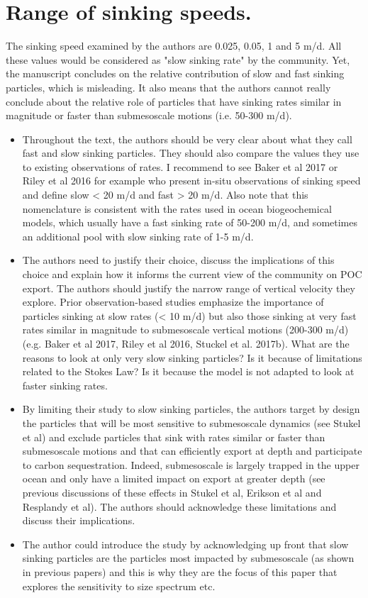 \documentclass[article,linenumbers]{agujournal2018}
\begin{document}
	\color{red}
	\section*{Range of sinking speeds.}
	The sinking speed examined by the authors are 0.025, 0.05, 1 and 5 m/d. All these values would be considered as "slow sinking rate" by the community. Yet, the manuscript concludes on the relative contribution of slow and fast sinking particles, which is misleading. It also means that the authors cannot really conclude about the relative role of particles that have sinking rates similar in magnitude or faster than submesoscale motions (i.e. 50-300 m/d).
	
	\begin{itemize}
	\item Throughout the text, the authors should be very clear about what they call fast and slow sinking particles. They should also compare the values they use to existing observations of rates. I recommend to see Baker et al 2017 or Riley et al 2016 for example who present in-situ observations of sinking speed and define slow < 20 m/d and fast > 20 m/d. Also note that this nomenclature is consistent with the rates used in ocean biogeochemical models, which usually have a fast sinking rate of 50-200 m/d, and sometimes an additional pool with slow sinking rate of 1-5 m/d. 
	
	
	\item The authors need to justify their choice, discuss the implications of this choice and explain how it informs the current view of the community on POC export. The authors should justify the narrow range of vertical velocity they explore. Prior observation-based studies emphasize the importance of particles sinking at slow rates (< 10 m/d) but also those sinking at very fast rates similar in magnitude to submesoscale vertical motions (200-300 m/d) (e.g. Baker et al 2017, Riley et al 2016, Stuckel et al. 2017b). What are the reasons to look at only very slow sinking particles? Is it because of limitations related to the Stokes Law? Is it because the model is not adapted to look at faster sinking rates.
	
	\item By limiting their study to slow sinking particles, the authors target by design the particles that will be most sensitive to submesoscale dynamics (see Stukel et al) and exclude particles that sink with rates similar or faster than submesoscale motions and that can efficiently export at depth and participate to carbon sequestration. Indeed, submesoscale is largely trapped in the upper ocean and only have a limited impact on export at greater depth (see previous discussions of these effects in Stukel et al, Erikson et al and Resplandy et al). The authors should acknowledge these limitations and discuss their implications.
	
	\item The author could introduce the study by acknowledging up front that slow sinking particles are the particles most impacted by submesoscale (as shown in previous papers) and this is why they are the focus of this paper that explores the sensitivity to size spectrum etc. 
	\end{itemize}
	
\end{document}

